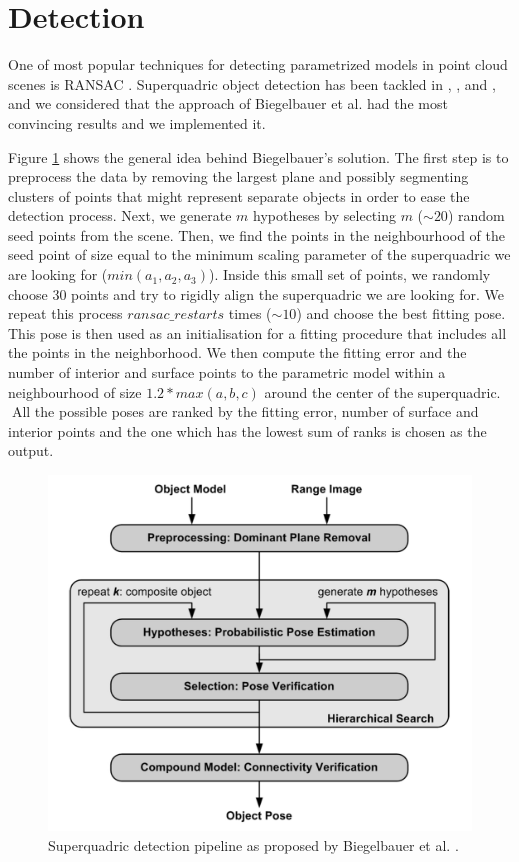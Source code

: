 \documentclass{article}
\begin{document}
\section {Detection}
\label{sec:detection}

One of most popular techniques for detecting parametrized models in point cloud scenes is RANSAC \cite{fischler1981random}. Superquadric object detection has been tackled in \cite{afanasyev3d}, \cite{conf/caip/KrivicS01}, and \cite{conf/icra/BiegelbauerV07}, and we considered that the approach of Biegelbauer et al. \cite{conf/icra/BiegelbauerV07} had the most convincing results and we implemented it.

Figure \ref{fig:superquadric_detection_schematic} shows the general idea behind Biegelbauer's solution. The first step is to preprocess the data by removing the largest plane and possibly segmenting clusters of points that might represent separate objects in order to ease the detection process. Next, we generate $m$ hypotheses by selecting $m$ ($\sim 20$) random seed points from the scene. Then, we find the points in the neighbourhood of the seed point of size equal to the minimum scaling parameter of the superquadric we are looking for ($min (a_1, a_2, a_3)$). Inside this small set of points, we randomly choose 30 points and try to rigidly align the superquadric we are looking for. We repeat this process $ransac\_restarts$ times ($\sim 10$) and choose the best fitting pose. This pose is then used as an initialisation for a fitting procedure that includes all the points in the neighborhood. We then compute the fitting error and the number of interior and surface points to the parametric model within a neighbourhood of size $1.2 * max(a,b,c)$ around the center of the superquadric. All the possible poses are ranked by the fitting error, number of surface and interior points and the one which has the lowest sum of ranks is chosen as the output.

\begin{figure}
\centering
\includegraphics[width=0.55\columnwidth]{figures/superquadric_detection_schematic}

\caption{Superquadric detection pipeline as proposed by Biegelbauer et al. \cite{conf/icra/BiegelbauerV07}.}
\label{fig:superquadric_detection_schematic}
\end{figure}
\end{document}
